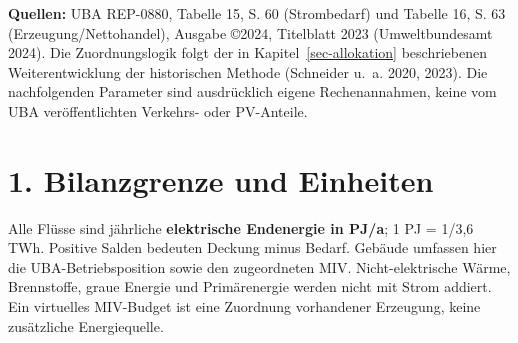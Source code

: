 \documentclass[
  ngerman,
  a4paper,
  DIV=11]{scrreprt}
\begin{document}
\textbf{Quellen:} UBA REP-0880, Tabelle 15, S. 60 (Strombedarf) und
Tabelle 16, S. 63 (Erzeugung/Nettohandel), Ausgabe ©2024, Titelblatt
2023 (Umweltbundesamt 2024). Die Zuordnungslogik folgt der in
Kapitel~\ref{sec-allokation} beschriebenen Weiterentwicklung der
historischen Methode (Schneider u.~a. 2020, 2023). Die nachfolgenden
Parameter sind ausdrücklich eigene Rechenannahmen, keine vom UBA
veröffentlichten Verkehrs- oder PV-Anteile.

\section{1. Bilanzgrenze und
Einheiten}\label{bilanzgrenze-und-einheiten}

Alle Flüsse sind jährliche \textbf{elektrische Endenergie in PJ/a}; 1 PJ
= 1/3,6 TWh. Positive Salden bedeuten Deckung minus Bedarf. Gebäude
umfassen hier die UBA-Betriebsposition sowie den zugeordneten MIV.
Nicht-elektrische Wärme, Brennstoffe, graue Energie und Primärenergie
werden nicht mit Strom addiert. Ein virtuelles MIV-Budget ist eine
Zuordnung vorhandener Erzeugung, keine zusätzliche Energiequelle.
\end{document}
